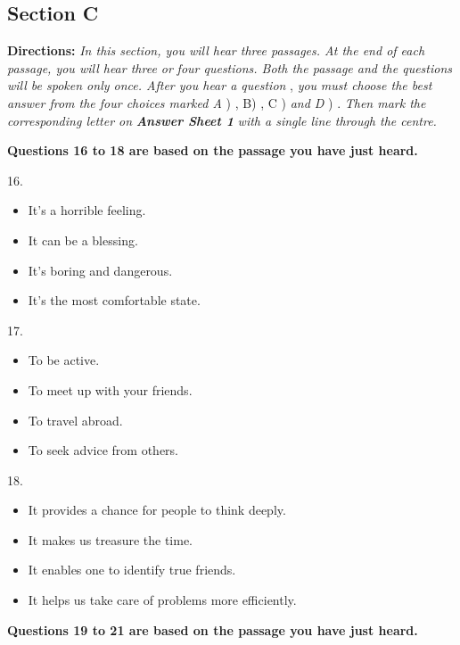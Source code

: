 \documentclass[UTF8,11pt]{ctexart}
\begin{document}
\subsection*{\textbf{Section C}}


\textbf{Directions: }\textit{In this section, you will hear three passages. At the end of each passage, you will hear three or} \textit{four questions. Both the passage and the questions will be spoken only once. After you hear a question }, \textit{you} \textit{must choose the best answer from the four choices marked A }) , B) , C ) \textit{and D }) . \textit{Then mark the} \textit{corresponding letter on }\textbf{\textit{Answer Sheet 1 }}\textit{with a single line through the centre.}


\textbf{Questions 16 to 18 are based on the passage you have just heard.}


16.


\begin{itemize}[leftmargin=2em,itemsep=.2em,topsep=.4em]\item[A.] It's a horrible feeling.
\item[B.] It can be a blessing.
\item[C.] It's boring and dangerous.
\item[D.] It's the most comfortable state.
\end{itemize}

17.


\begin{itemize}[leftmargin=2em,itemsep=.2em,topsep=.4em]\item[A.] To be active.
\item[B.] To meet up with your friends.
\item[C.] To travel abroad.
\item[D.] To seek advice from others.
\end{itemize}

18.


\begin{itemize}[leftmargin=2em,itemsep=.2em,topsep=.4em]\item[A.] It provides a chance for people to think deeply.
\item[B.] It makes us treasure the time.
\item[C.] It enables one to identify true friends.
\item[D.] It helps us take care of problems more efficiently.
\end{itemize}

\textbf{Questions 19 to 21 are based on the passage you have just heard.}
\end{document}
